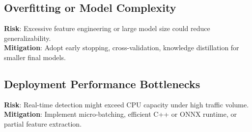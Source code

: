 \documentclass[12pt]{article}
\begin{document}
\subsection{Overfitting or Model Complexity}
\textbf{Risk}: Excessive feature engineering or large model size could reduce generalizability.\\
\textbf{Mitigation}: Adopt early stopping, cross-validation, knowledge distillation for smaller final models.

\subsection{Deployment Performance Bottlenecks}
\textbf{Risk}: Real-time detection might exceed CPU capacity under high traffic volume.\\
\textbf{Mitigation}: Implement micro-batching, efficient C++ or ONNX runtime, or partial feature extraction.


\printbibliography
\end{document}
